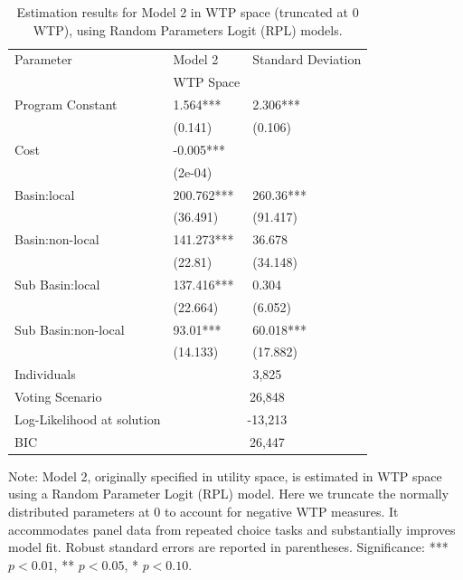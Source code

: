 {
\renewcommand{\thetable}{A3.3} %
\begin{table}[ht]
\caption{Estimation results for Model 2 in WTP space (truncated at 0 WTP), using Random Parameters Logit (RPL) models.}

\centering
\begin{tabular}{lll}
  \hline
Parameter & Model 2  & Standard Deviation \\ 
 & WTP Space & \\ 

  \hline
Program Constant & 1.564*** & 2.306*** \\ 
   & (0.141) & (0.106) \\ 
  Cost & -0.005*** &  \\ 
   & (2e-04) &  \\ 
  Basin:local & 200.762*** & 260.36*** \\ 
   & (36.491) & (91.417) \\ 
  Basin:non-local & 141.273*** & 36.678 \\ 
   & (22.81) & (34.148) \\ 
  Sub Basin:local & 137.416*** & 0.304 \\ 
   & (22.664) & (6.052) \\ 
  Sub Basin:non-local & 93.01*** & 60.018*** \\ 
   & (14.133) & (17.882) \\ 
\hline
Individuals & \multicolumn{2}{c}{3,825}  \\ 
Voting Scenario & \multicolumn{2}{c}{26,848}  \\ 
Log-Likelihood at solution & \multicolumn{2}{c}{-13,213 }  \\ 
BIC & \multicolumn{2}{c}{26,447}  \\ 
\hline
\end{tabular}
\begin{minipage}{12cm}
\footnotesize
Note: Model 2, originally specified in utility space, is estimated in WTP space using a Random Parameter Logit (RPL) model. 
Here we truncate the normally distributed parameters at 0 to account for negative WTP measures. It accommodates panel data 
from repeated choice tasks and substantially improves model fit. Robust standard errors are reported in parentheses. 
Significance: *** $p < 0.01$, ** $p < 0.05$, * $p < 0.10$.
\end{minipage}
\end{table}
}
